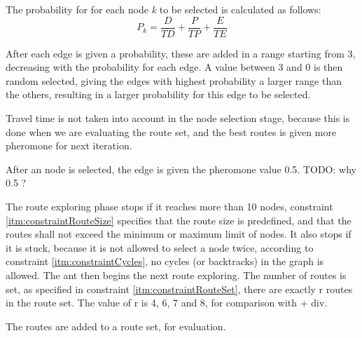 
The probability for for each node \textit{k} to be selected is calculated as follows:
$$ P_{k} = \frac{D}{TD} + \frac{P}{TP} + \frac{E}{TE}$$ 

After each edge is given a probability, these are added in a range starting from 3, decreasing with the probability for each edge. A value between 3 and 0 is then random selected, giving the edges with highest probability a larger range than the others, resulting in a larger probability for this edge to be selected. 

Travel time is not taken into account in the node selection stage, because this is done when we are evaluating the route set, and the best routes is given more pheromone for next iteration. %

After an node is selected, the edge is given the pheromone value 0.5. TODO: why 0.5 ?

The route exploring phase stops if it reaches more than 10 nodes, constraint \ref{itm:constraintRouteSize} specifies that the route size is predefined, and that the routes shall not exceed the minimum or maximum limit of nodes. It also stops if it is stuck, because it is not allowed to select a node twice, according to constraint \ref{itm:constraintCycles}, no cycles (or backtracks) in the graph is allowed. The ant then begins the next route exploring. The number of routes is set, as specified in constraint \ref{itm:constraintRouteSet}, there are exactly r routes in the route set. The value of r is 4, 6, 7 and 8, for comparison with \citep{kechagiopoulos14} + div.



The routes are added to a route set, for evaluation.


